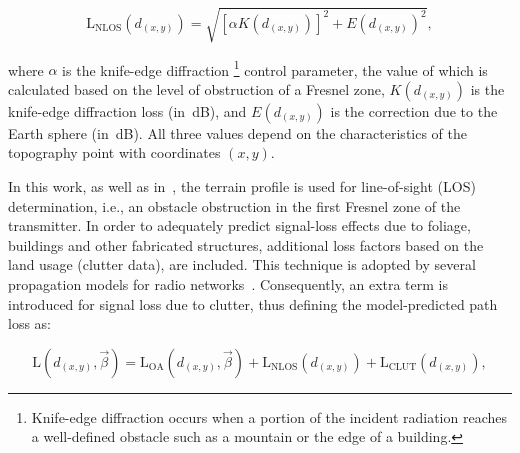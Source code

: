 \begin{equation}
\mathrm{L}{}_{\mathrm{NLOS}}(d_{(x,y)})=\sqrt{\left[\alpha K(d_{(x,y)})\right]^{2}+E(d_{(x,y)})^{2}},\label{eq:04-Hata_NLOS}
\end{equation}


\noindent {}

\noindent where $\alpha$ is the knife-edge diffraction%
\footnote{\noindent Knife-edge diffraction occurs when a portion of the incident
radiation reaches a well-defined obstacle such as a mountain or the
edge of a building.%
} control parameter, the value of which is calculated based on the
level of obstruction of a Fresnel zone, $K(d_{(x,y)})$ is the knife-edge
diffraction loss (in~dB), and $E(d_{(x,y)})$ is the correction due
to the Earth sphere (in~dB). All three values depend on the characteristics
of the topography point with coordinates $(x,y)$.

In this work, as well as in~\cite{Filiposka_Terrain_aware_three_dimensional_radio_propagation_model_extension_for_NS2:2011},
the terrain profile is used for line-of-sight (LOS)
determination, i.e., an obstacle obstruction in the first Fresnel
zone of the transmitter. In order to adequately predict signal-loss
effects due to foliage, buildings and other fabricated structures,
additional loss factors based on the land usage (clutter data), are
included. This technique is adopted by several propagation models
for radio networks~\cite{Aarnaes-Tuning_of_empirical_radio_propagation_models_effect_of_location_accuracy:2004,Begovic_Applicability_evaluation_of_Okumura_Ericsson_and_Winner_propagation_models_for_coverage_planning:2012,Neskovic_Microcell_electric_field_strength_prediction_model:2010}.
Consequently, an extra term is introduced for signal loss due to clutter,
thus defining the model-predicted path loss as:

\begin{equation}
\mathrm{L}(d_{(x,y)},\vec{\beta})=\mathrm{L}{}_{\mathrm{OA}}(d_{(x,y)},\vec{\beta})+\mathrm{L}_{\mathrm{NLOS}}(d_{(x,y)})+\mathrm{L}{}_{\mathrm{CLUT}}(d_{(x,y)}),\label{eq:04-Hata_pathloss}
\end{equation}


\noindent {}

